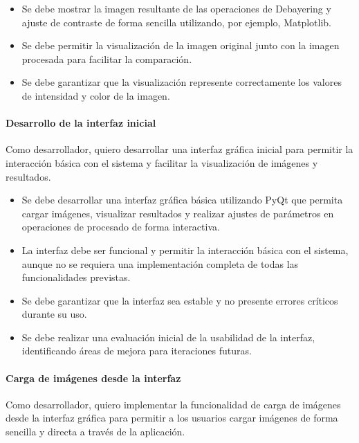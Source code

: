 \begin{itemize}[noitemsep]
	\item Se debe mostrar la imagen resultante de las operaciones de Debayering y ajuste de contraste de forma sencilla utilizando,
	por ejemplo, Matplotlib.
	\item Se debe permitir la visualización de la imagen original junto con la imagen procesada para facilitar la comparación.
	\item Se debe garantizar que la visualización represente correctamente los valores de intensidad y color de la imagen.
\end{itemize}

\paragraph{Desarrollo de la interfaz inicial} \label{hist:desarrollo_interfaz_inicial}
Como desarrollador, quiero desarrollar una interfaz gráfica inicial para permitir la interacción básica con el sistema 
y facilitar la visualización de imágenes y resultados.

\begin{itemize}[noitemsep]
	\item Se debe desarrollar una interfaz gráfica básica utilizando PyQt que permita cargar imágenes, visualizar
	resultados y realizar ajustes de parámetros en operaciones de procesado de forma interactiva.
	\item La interfaz debe ser funcional y permitir la interacción básica con el sistema, aunque no se requiera una implementación completa de todas las funcionalidades previstas.
	\item Se debe garantizar que la interfaz sea estable y no presente errores críticos durante su uso.
	\item Se debe realizar una evaluación inicial de la usabilidad de la interfaz, identificando áreas de mejora para iteraciones futuras.
\end{itemize}

\paragraph{Carga de imágenes desde la interfaz} \label{hist:carga_imagenes_interfaz}
Como desarrollador, quiero implementar la funcionalidad de carga de imágenes desde la interfaz gráfica para permitir
a los usuarios cargar imágenes de forma sencilla y directa a través de la aplicación.

